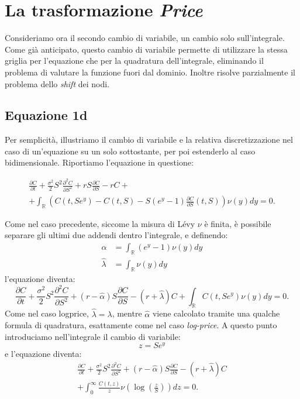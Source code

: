 \documentclass[a4paper,10pt]{report}
\newcommand{\der}[2]{\frac{\partial #1}{\partial #2}}
\newcommand{\dder}[2]{\frac{\partial^2 #1}{\partial #2^2}}
\theoremstyle{plain}
\theoremstyle{definition}
\theoremstyle{remark}
\begin{document}

\section{La trasformazione \emph{Price}}
\label{sec:Price}
Consideriamo ora il secondo cambio di variabile, un cambio solo sull'integrale. Come già anticipato, questo cambio di variabile permette di utilizzare la stessa griglia per l'equazione che per la quadratura dell'integrale, eliminando il problema di valutare la funzione fuori dal dominio. Inoltre risolve parzialmente il problema dello \emph{shift} dei nodi.
\subsection{Equazione 1d}
Per semplicità, illustriamo il cambio di variabile e la relativa discretizzazione nel caso di un'equazione su un solo sottostante, per poi estenderlo al caso bidimensionale. Riportiamo l'equazione in questione:

\begin{multline*}
\label{eq:PIDE1d_will_price}
\der{C}{t}+\frac{\sigma^2}{2}S^2\dder{C}{S}+rS\der{C}{S}-rC+\\+ \int_\mathbb{R}\left(C(t,Se^y)-C(t,S)-S(e^y-1)\der{C}{S}(t,S)\right)\nu(y)dy=0.
\end{multline*}

Come nel caso precedente, siccome la misura di Lévy $\nu$ è finita, è possibile separare gli ultimi due addendi dentro l'integrale, e definendo:
\begin{align*}
 \hat{\alpha}&=\int_\mathbb{R}(e^y-1)\nu(y)dy \\
 \hat{\lambda}&=\int_\mathbb{R}\nu(y)dy
\end{align*}
l'equazione diventa:
\begin{equation*}
\der{C}{t}+\frac{\sigma^2}{2}S^2\dder{C}{S}+(r-\hat{\alpha})S\der{C}{S}-(r+\hat{\lambda})C+ \int_\mathbb{R}C(t,Se^y)\nu(y)dy=0.
\end{equation*}
Come nel caso logprice, $\hat{\lambda}=\lambda$, mentre $\hat{\alpha}$ viene calcolato tramite una qualche formula di quadratura, esattamente come nel caso \emph{log-price}. A questo punto introduciamo nell'integrale il cambio di variabile:
\begin{equation*}
 z=Se^y
\end{equation*}
e l'equazione diventa:
\begin{multline}
\label{eq:PIDEinPrice}
\der{C}{t}+\frac{\sigma^2}{2}S^2\dder{C}{S}+(r-\hat{\alpha})S\der{C}{S}-(r+\hat{\lambda})C\\+\int_0^\infty \frac{C(t,z)}{z}\nu\left(\log\left(\frac{z}{S}\right) \right)dz=0.
\end{multline}
\end{document}
